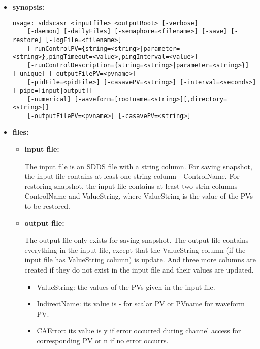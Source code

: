 \begin{itemize}
\item {\bf synopsis:} 
%
%
\begin{verbatim}
usage: sddscasr <inputfile> <outputRoot> [-verbose]
    [-daemon] [-dailyFiles] [-semaphore=<filename>] [-save] [-restore] [-logFile=<filename>]
    [-runControlPV={string=<string>|parameter=<string>},pingTimeout=<value>,pingInterval=<value>]
    [-runControlDescription={string=<string>|parameter=<string>}] [-unique] [-outputFilePV=<pvname>]
    [-pidFile=<pidFile>] [-casavePV=<string>] [-interval=<seconds>] [-pipe=[input|output]]
    [-numerical] [-waveform=[rootname=<string>][,directory=<string>]]
    [-outputFilePV=<pvname>] [-casavePV=<string>]
\end{verbatim}
\item {\bf files:}
\begin{itemize}
\item {\bf input file:} \par
The input file is an SDDS file with a string column. For saving snapshot, the input file
contains at least one string column - ControlName. For restoring snapshot, the input file
contains at least two strin columns - ControlName and ValueString, where ValueString is the
value of the PVs to be restored.
\item {\bf output file:} \par
The output file only exists for saving snapshot. The output file contains everything in the input
file, except that the ValueString column (if the input file has ValueString column) is update. And
three more columns are created if they do not exist in the input file and their values are updated.
\begin{itemize}
\item {ValueString}: the values of the PVs given in the input file.
\item {IndirectName}: its value  is - for scalar PV or PVname for waveform PV.
\item {CAError}: its value is y if error occurred during channel access for
corresponding PV or n if no error occurrs.
\end{itemize}
\end{itemize}


\end{itemize}
